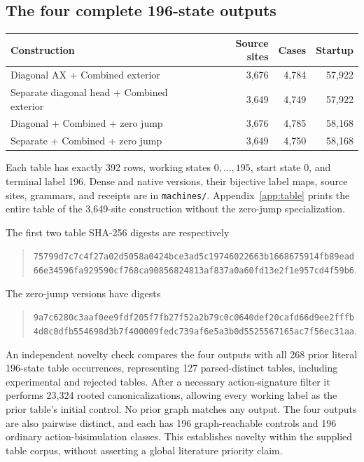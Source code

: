 \documentclass[11pt,letterpaper]{article}
\newcommand{\file}[1]{\texttt{\nolinkurl{#1}}}
\begin{document}
\subsection{The four complete 196-state outputs}

\begin{center}\small
\begin{tabular}{@{}p{2.65in}rrr@{}}
\toprule
Construction & Source sites & Cases & Startup\\
\midrule
Diagonal AX + Combined exterior & 3,676 & 4,784 & 57,922\\
Separate diagonal head + Combined exterior & 3,649 & 4,749 & 57,922\\
Diagonal + Combined + zero jump & 3,676 & 4,785 & 58,168\\
Separate + Combined + zero jump & 3,649 & 4,750 & 58,168\\
\bottomrule
\end{tabular}
\end{center}

Each table has exactly 392 rows, working states $0,\ldots,195$,
start state 0, and terminal label 196. Dense and native versions,
their bijective label maps, source sites, grammars, and receipts are in
\file{machines/}. Appendix~\ref{app:table} prints the entire table of
the 3,649-site construction without the zero-jump specialization.

The first two table SHA-256 digests are respectively
\begin{quote}\small
\nolinkurl{75799d7c7c4f27a02d5058a0424bce3ad5c19746022663b1668675914fb89ead}\\
\nolinkurl{66e34596fa929590cf768ca90856824813af837a0a60fd13e2f1e957cd4f59b6}.
\end{quote}
The zero-jump versions have digests
\begin{quote}\small
\nolinkurl{9a7c6280c3aaf0ee9fdf205f7fb27f52a2b79c0c0640def20cafd66d9ee2fffb}\\
\nolinkurl{4d8c0dfb554698d3b7f400009fedc739af6e5a3b0d5525567165ac7f56ec31aa}.
\end{quote}

An independent novelty check compares the four outputs with all 268
prior literal 196-state table occurrences, representing 127 parsed-distinct
tables, including experimental and rejected tables. After a necessary
action-signature filter it performs 23,324 rooted canonicalizations,
allowing every working label as the prior table's initial control.
No prior graph matches any output. The four outputs are also pairwise
distinct, and each has 196 graph-reachable controls and 196 ordinary
action-bisimulation classes. This establishes novelty within the supplied
table corpus, without asserting a global literature priority claim.
\end{document}
